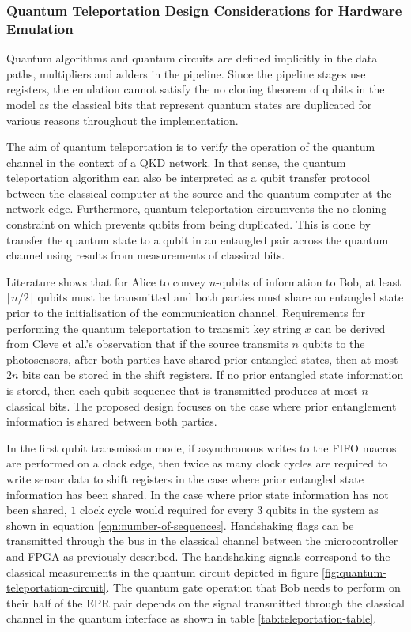 \subsubsection{Quantum Teleportation Design Considerations for Hardware Emulation}

Quantum algorithms and quantum circuits are defined implicitly in the data paths, multipliers and adders in the pipeline. Since the pipeline stages use registers, the emulation cannot satisfy the no cloning theorem of qubits in the model as the classical bits that represent quantum states are duplicated for various reasons throughout the implementation. 

The aim of quantum teleportation is to verify the operation of the quantum channel in the context of a QKD network. In that sense, the quantum teleportation algorithm can also be interpreted as a qubit transfer protocol between the classical computer at the source and the quantum computer at the network edge. Furthermore, quantum teleportation circumvents the no cloning constraint on which prevents qubits from being duplicated. This is done by transfer the quantum state to a qubit in an entangled pair across the quantum channel using results from measurements of classical bits.

Literature shows that for Alice to convey $n$-qubits of information to Bob, at least $\lceil n/2\rceil$ qubits must be transmitted and both parties must share an entangled state prior to the initialisation of the communication channel. Requirements for performing the quantum teleportation to transmit key string $x$ can be derived from Cleve et al.'s observation that if the source transmits $n$ qubits to the photosensors, after both parties have shared prior entangled states, then at most $2n$ bits can be stored in the shift registers. If no prior entangled state information is stored, then each qubit sequence that is transmitted produces at most $n$ classical bits. The proposed design focuses on the case where prior entanglement information is shared between both parties.

In the first qubit transmission mode, if asynchronous writes to the FIFO macros are performed on a clock edge, then twice as many clock cycles are required to write sensor data to shift registers in the case where prior entangled state information has been shared. In the case where prior state information has not been shared, $1$ clock cycle would required for every 3 qubits in the system as shown in equation \ref{eqn:number-of-sequences}. Handshaking flags can be transmitted through the bus in the classical channel between the microcontroller and FPGA as previously described. The handshaking signals correspond to the classical measurements in the quantum circuit depicted in figure \ref{fig:quantum-teleportation-circuit}. The quantum gate operation that Bob needs to perform on their half of the EPR pair depends on the signal transmitted through the classical channel in the quantum interface as shown in table \ref{tab:teleportation-table}.

